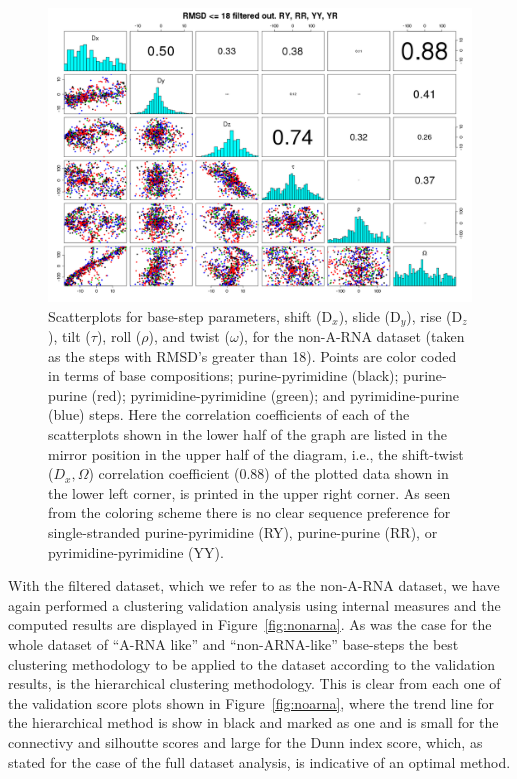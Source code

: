 \begin{figure}
\centering
\includegraphics[angle=90, scale=0.48]{Chapter2/noarna_step.png}
\caption{Scatterplots for base-step parameters, shift (D$_{x}$), slide
(D$_{y}$),  rise (D$_{z}$),  tilt ($\tau$),  roll ($\rho$),  and twist
($\omega$), for the non-A-RNA dataset  (taken as the steps with RMSD's
greater  than  18).    Points  are  color  coded  in   terms  of  base
compositions;   purine-pyrimidine    (black);   purine-purine   (red);
pyrimidine-pyrimidine    (green);    and   pyrimidine-purine    (blue)
steps. Here  the correlation coefficients of each  of the scatterplots
shown in the lower half of the graph are listed in the mirror position
in  the upper  half of  the  diagram, i.e.,  the shift-twist  ($D_{x},
\Omega$) correlation  coefficient (0.88) of the plotted  data shown in
the lower left corner, is printed  in the upper right corner.  As seen
from the  coloring scheme  there is no  clear sequence  preference for
single-stranded   purine-pyrimidine  (RY),   purine-purine   (RR),  or
pyrimidine-pyrimidine (YY).}
\label{fig:pairsnoarna}
\end{figure}

With the filtered dataset, which we refer to as the non-A-RNA dataset,
we  have  again  performed  a  clustering  validation  analysis  using
internal  measures   and  the   computed  results  are   displayed  in
Figure~\ref{fig:nonarna}.  As was the  case for  the whole  dataset of
``A-RNA  like'' and ``non-ARNA-like''  base-steps the  best clustering
methodology to be  applied to the dataset according  to the validation
results, is  the hierarchical  clustering methodology. This  is clear
from   each   one   of   the   validation   score   plots   shown   in
Figure~\ref{fig:noarna},  where the  trend line  for  the hierarchical
method  is show in  black and  marked as  one and  is small  for the
connectivy and  silhoutte scores and  large for the Dunn  index score,
which,  as  stated for  the  case of  the  full  dataset analysis,  is
indicative of an optimal method.

